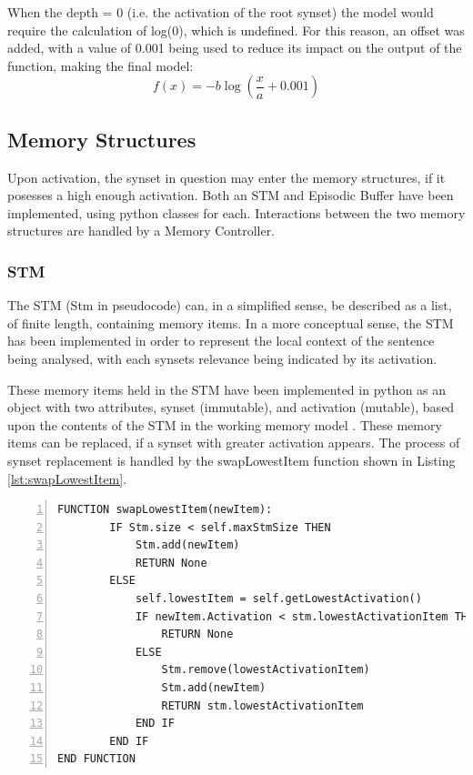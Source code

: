 \documentclass[]{article}
\begin{document}
When the depth = 0 (i.e. the activation of the root synset) the model would require the calculation of log(0), which is undefined. For this reason, an offset was added, with a value of 0.001 being used to reduce its impact on the output of the function, making the final model:
\[f(x) = -b\log(\frac{x}{a}+0.001)\]


\subsection{Memory Structures}
\label{sec:ImplementedMemoryStructures}

Upon activation, the synset in question may enter the memory structures, if it posesses a high enough activation. Both an STM and Episodic Buffer have been implemented, using python classes for each. Interactions between the two memory structures are handled by a Memory Controller. 

\subsubsection{STM}
\label{sec:ImplementedSTM}

The STM (Stm in pseudocode) can, in a simplified sense, be described as a list, of finite length, containing memory items. In a more conceptual sense, the STM has been implemented in order to represent the local context of the sentence being analysed, with each synsets relevance being indicated by its activation. 

These memory items held in the STM have been implemented in python as an object with two attributes, synset (immutable), and activation (mutable), based upon the contents of the STM in the working memory model \cite{MemoryBaddeleyEysenkAnderson}. These memory items can be replaced, if a synset with greater activation appears. The process of synset replacement is handled by the swapLowestItem function shown in Listing \ref{lst:swapLowestItem}.

\begin{lstlisting}[numbers=left, numberstyle=\small, caption={the swapLowestItem function}, captionpos=b, label={lst:swapLowestItem}]
FUNCTION swapLowestItem(newItem):
        IF Stm.size < self.maxStmSize THEN
            Stm.add(newItem)
            RETURN None
        ELSE
            self.lowestItem = self.getLowestActivation()
            IF newItem.Activation < stm.lowestActivationItem THEN
                RETURN None
            ELSE
                Stm.remove(lowestActivationItem)
                Stm.add(newItem)
                RETURN stm.lowestActivationItem
            END IF
        END IF
END FUNCTION
\end{lstlisting}
\end{document}
